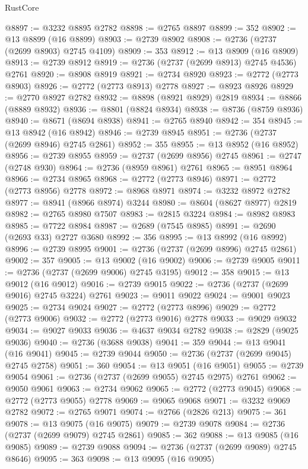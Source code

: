 \begin{lexlean}{RustCore}
\begin{coremodule}
@8897 := @3232 @8895 @2782
@8898 := @2765 @8897
@8899 := 352
@8902 := @13 @8899 (@16 @8899)
@8903 := @2739 @8902
@8908 := @2736 (@2737 (@2699 @8903) @2745 @4109)
@8909 := 353
@8912 := @13 @8909 (@16 @8909)
@8913 := @2739 @8912
@8919 := @2736 (@2737 (@2699 @8913) @2745 @4536) @2761
@8920 := @8908 @8919
@8921 := @2734 @8920
@8923 := @2772 (@2773 @8903)
@8926 := @2772 (@2773 @8913) @2778
@8927 := @8923 @8926
@8929 := @2770 @8927 @2782
@8932 := @8898 (@8921 @8929) @2819
@8934 := @8866 (@8889 @8932)
@8936 := @8801 (@8824 @8934)
@8938 := @8736 (@8759 @8936)
@8940 := @8671 (@8694 @8938)
@8941 := @2765 @8940
@8942 := 354
@8945 := @13 @8942 (@16 @8942)
@8946 := @2739 @8945
@8951 := @2736 (@2737 (@2699 @8946) @2745 @2861)
@8952 := 355
@8955 := @13 @8952 (@16 @8952)
@8956 := @2739 @8955
@8959 := @2737 (@2699 @8956) @2745
@8961 := @2747 (@2748 @930)
@8964 := @2736 (@8959 @8961) @2761
@8965 := @8951 @8964
@8966 := @2734 @8965
@8968 := @2772 (@2773 @8946)
@8971 := @2772 (@2773 @8956) @2778
@8972 := @8968 @8971
@8974 := @3232 @8972 @2782
@8977 := @8941 (@8966 @8974) @3244
@8980 := @8604 (@8627 @8977) @2819
@8982 := @2765 @8980 @7507
@8983 := @2815 @3224
@8984 := @8982 @8983
@8985 := @7722 @8984
@8987 := @2689 (@7545 @8985)
@8991 := @2690 (@2693 @33) @2727 @3680
@8992 := 356
@8995 := @13 @8992 (@16 @8992)
@8996 := @2739 @8995
@9001 := @2736 (@2737 (@2699 @8996) @2745 @2861)
@9002 := 357
@9005 := @13 @9002 (@16 @9002)
@9006 := @2739 @9005
@9011 := @2736 (@2737 (@2699 @9006) @2745 @3195)
@9012 := 358
@9015 := @13 @9012 (@16 @9012)
@9016 := @2739 @9015
@9022 := @2736 (@2737 (@2699 @9016) @2745 @3224) @2761
@9023 := @9011 @9022
@9024 := @9001 @9023
@9025 := @2734 @9024
@9027 := @2772 (@2773 @8996)
@9029 := @2772 (@2773 @9006)
@9032 := @2772 (@2773 @9016) @2778
@9033 := @9029 @9032
@9034 := @9027 @9033
@9036 := @4637 @9034 @2782
@9038 := @2829 (@9025 @9036)
@9040 := @2736 (@3688 @9038)
@9041 := 359
@9044 := @13 @9041 (@16 @9041)
@9045 := @2739 @9044
@9050 := @2736 (@2737 (@2699 @9045) @2745 @2758)
@9051 := 360
@9054 := @13 @9051 (@16 @9051)
@9055 := @2739 @9054
@9061 := @2736 (@2737 (@2699 @9055) @2745 @2975) @2761
@9062 := @9050 @9061
@9063 := @2734 @9062
@9065 := @2772 (@2773 @9045)
@9068 := @2772 (@2773 @9055) @2778
@9069 := @9065 @9068
@9071 := @3232 @9069 @2782
@9072 := @2765 @9071
@9074 := @2766 (@2826 @213)
@9075 := 361
@9078 := @13 @9075 (@16 @9075)
@9079 := @2739 @9078
@9084 := @2736 (@2737 (@2699 @9079) @2745 @2861)
@9085 := 362
@9088 := @13 @9085 (@16 @9085)
@9089 := @2739 @9088
@9094 := @2736 (@2737 (@2699 @9089) @2745 @8646)
@9095 := 363
@9098 := @13 @9095 (@16 @9095)

\end{coremodule}
\end{lexlean}
